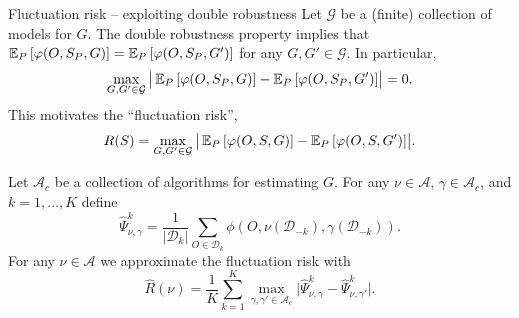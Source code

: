 \documentclass[smaller]{beamer}\usepackage{listings}
\begin{document}
\begin{frame}[label={sec:orga040568}]{Fluctuation risk -- exploiting double robustness}
\small Let \(\mathcal{G}\) be a (finite) collection of models for \(G\). The double robustness
property implies that
\(\operatorname{\mathbb{E}}_P{\left[ \varphi(O, S_P, G) \right]} = \operatorname{\mathbb{E}}_P{\left[ \varphi(O, S_P, G') \right]}\) for any
\(G, G' \in \mathcal{G}\). In particular,
\begin{equation*}
  \max_{G, G' \in \mathcal{G}}\big\vert
  \operatorname{\mathbb{E}}_P{\left[ \varphi(O, S_P, G) \right]}
  - \operatorname{\mathbb{E}}_P{\left[ \varphi(O, S_P, G') \right]}     
  \big\vert
  = 0.
\end{equation*}
This motivates the ``fluctuation risk'',
\begin{equation*}
  R(S)
  =
  \max_{G, G' \in \mathcal{G}}\big\vert
  \operatorname{\mathbb{E}}_P{\left[ \varphi(O, S, G) \right]}
  - \operatorname{\mathbb{E}}_P{\left[ \varphi(O, S, G') \right]}     
  \big\vert.
\end{equation*}

Let $\mathcal{A}_c$ be a collection of algorithms for estimating \(G\). For any $\nu \in \mathcal{A}$,
$\gamma \in \mathcal{A}_c$, and \(k = 1, \dots, K\) define
\begin{equation*}
  \hat{\Psi}_{\nu, \gamma}^k =
  \frac{1}{|\mathcal{D}_k|} \sum_{O \in \mathcal{D}_k}
  \phi(O, \nu(\mathcal{D}_{-k}), \gamma(\mathcal{D}_{-k})).
\end{equation*}
For any $\nu \in \mathcal{A}$ we approximate the fluctuation risk with
\begin{equation*}
  \hat R(\nu) =
  \frac{1}{K}
  \sum_{k=1}^{K}
  \max_{\gamma, \gamma' \in \mathcal{A}_c}
  \big|\hat{\Psi}_{\nu, \gamma}^k -
  \hat{\Psi}_{\nu, \gamma'}^k\big|.  
\end{equation*}
\end{frame}
\end{document}
